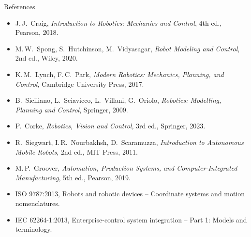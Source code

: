 \documentclass[aspectratio=169,10pt]{beamer}
\begin{document}
\begin{frame}[t]{References}
\scriptsize
\begin{itemize}\setlength\itemsep{2pt}
\item J.\,J.~Craig, \emph{Introduction to Robotics: Mechanics and Control}, 4th ed., Pearson, 2018.
\item M.\,W.~Spong, S.~Hutchinson, M.~Vidyasagar, \emph{Robot Modeling and Control}, 2nd ed., Wiley, 2020.
\item K.\,M.~Lynch, F.\,C.~Park, \emph{Modern Robotics: Mechanics, Planning, and Control}, Cambridge University Press, 2017.
\item B.~Siciliano, L.~Sciavicco, L.~Villani, G.~Oriolo, \emph{Robotics: Modelling, Planning and Control}, Springer, 2009.
\item P.~Corke, \emph{Robotics, Vision and Control}, 3rd ed., Springer, 2023.
\item R.~Siegwart, I.\,R.~Nourbakhsh, D.~Scaramuzza, \emph{Introduction to Autonomous Mobile Robots}, 2nd ed., MIT Press, 2011.
\item M.\,P.~Groover, \emph{Automation, Production Systems, and Computer-Integrated Manufacturing}, 5th ed., Pearson, 2019.
\item ISO 9787:2013, Robots and robotic devices -- Coordinate systems and motion nomenclatures.
\item IEC 62264-1:2013, Enterprise-control system integration -- Part 1: Models and terminology.
\end{itemize}
\end{frame}
\end{document}
